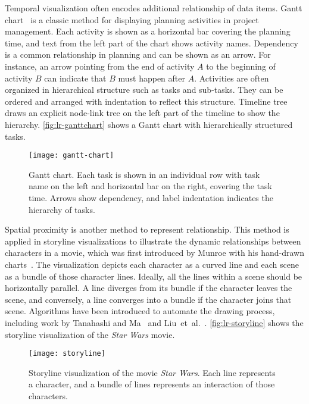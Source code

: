 Temporal visualization often encodes additional relationship of data items. Gantt chart~\cite{Gantt1913} is a classic method for displaying planning activities in project management. Each activity is shown as a horizontal bar covering the planning time, and text from the left part of the chart shows activity names. Dependency is a common relationship in planning and can be shown as an arrow. For instance, an arrow pointing from the end of activity $A$ to the beginning of activity $B$ can indicate that $B$ must happen after $A$. Activities are often organized in hierarchical structure such as tasks and sub-tasks. They can be ordered and arranged with indentation to reflect this structure. Timeline tree~\cite{Burch2008} draws an explicit node-link tree on the left part of the timeline to show the hierarchy. \autoref{fig:lr-ganttchart} shows a Gantt chart with hierarchically structured tasks.

\begin{figure}[!htb]
	\centering
	\texttt{[image: gantt-chart]}
	\caption{Gantt chart. Each task is shown in an individual row with task name on the left and horizontal bar on the right, covering the task time. Arrows show dependency, and label indentation indicates the hierarchy of tasks. }
	\label{fig:lr-ganttchart}
\end{figure}

Spatial proximity is another method to represent relationship. This method is applied in storyline visualizations to illustrate the dynamic relationships between characters in a movie, which was first introduced by Munroe with his hand-drawn charts~\cite{Munroe2009}. The visualization depicts each character as a curved line and each scene as a bundle of those character lines. Ideally, all the lines within a scene should be horizontally parallel. A line diverges from its bundle if the character leaves the scene, and conversely, a line converges into a bundle if the character joins that scene. Algorithms have been introduced to automate the drawing process, including work by Tanahashi and Ma~\cite{Tanahashi2012} and Liu~et~al.~\cite{Liu2013}. \autoref{fig:lr-storyline} shows the storyline visualization of the \emph{Star Wars} movie.

\begin{figure}[!htb]
	\centering
	\texttt{[image: storyline]}
	\caption{Storyline visualization of the movie \emph{Star Wars}. Each line represents a character, and a bundle of lines represents an interaction of those characters. }
	\label{fig:lr-storyline}
\end{figure}

